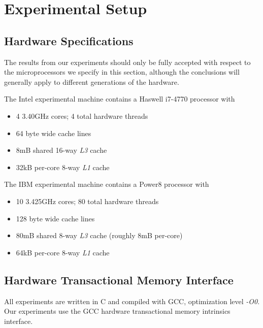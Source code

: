 \section{Experimental Setup}
\subsection{Hardware Specifications}
The results from our experiments should only be fully accepted with respect to
the microprocessors we specify in this section, although the conclusions will
generally apply to different generations of the hardware.

The Intel experimental machine contains a Haswell i7-4770 processor with

\begin{spacing}{0}
\begin{itemize}
\item 4 3.40GHz cores; 4 total hardware threads
\item 64 byte wide cache lines
\item 8mB shared 16-way \textit{L3} cache
\item 32kB per-core 8-way \textit{L1} cache
\end{itemize}

The IBM experimental machine contains a Power8 processor with
\begin{itemize}
\item 10 3.425GHz cores; 80 total hardware threads
\item 128 byte wide cache lines
\item 80mB shared 8-way \textit{L3} cache (roughly 8mB per-core)
\item 64kB per-core 8-way \textit{L1} cache
\end{itemize}
\end{spacing}

\subsection{Hardware Transactional Memory Interface}
All experiments are written in C and compiled with GCC, optimization level
\textit{-O0}. Our experiments use the GCC hardware transactional memory
intrinsics interface.
 
